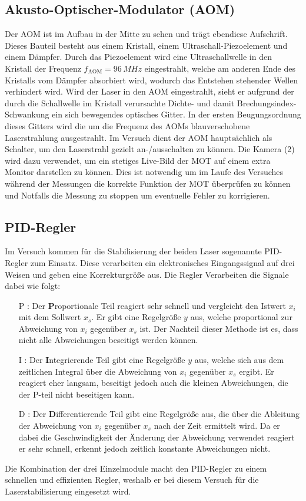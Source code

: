\documentclass[twoside,colorback,accentcolor=tud4c,11pt]{tudreport}
\begin{document}
\subsection{Akusto-Optischer-Modulator (AOM)}
Der AOM ist im Aufbau in der Mitte zu sehen und trägt ebendiese Aufschrift. Dieses Bauteil besteht aus einem Kristall, einem Ultraschall-Piezoelement und einem Dämpfer. Durch das Piezoelement wird eine Ultraschallwelle in den Kristall der Frequenz $f_{\text{AOM}}=96\,\si{MHz}$ eingestrahlt, welche am anderen Ende des Kristalls vom Dämpfer absorbiert wird, wodurch das Entstehen stehender Wellen verhindert wird. Wird der Laser in den AOM eingestrahlt, sieht er aufgrund der durch die Schallwelle im Kristall verursachte Dichte- und damit Brechungsindex-Schwankung ein sich bewegendes optisches Gitter. In der ersten Beugungsordnung dieses Gitters wird die um die Frequenz des AOMs blauverschobene Laserstrahlung ausgestrahlt. Im Versuch dient der AOM hauptsächlich als Schalter, um den Laserstrahl gezielt an-/ausschalten zu können.
Die Kamera (2) wird dazu verwendet, um ein stetiges Live-Bild der MOT auf einem extra Monitor darstellen zu können. Dies ist notwendig um im Laufe des Versuches während der Messungen die korrekte Funktion der MOT überprüfen zu können und Notfalls die Messung zu stoppen um eventuelle Fehler zu korrigieren.
\subsection{PID-Regler}
Im Versuch kommen für die Stabilisierung der beiden Laser sogenannte PID-Regler zum Einsatz. Diese verarbeiten ein elektronisches Eingangssignal auf drei Weisen und geben eine Korrekturgröße aus. Die Regler Verarbeiten die Signale dabei wie folgt:
\begin{itemize}
\item[P]: Der $\textbf{P}$roportionale Teil reagiert sehr schnell und vergleicht den Istwert $x_i$ mit dem Sollwert $x_s$. Er gibt eine Regelgröße $y$ aus, welche proportional zur Abweichung von $x_i$ gegenüber $x_s$ ist. Der Nachteil dieser Methode ist es, dass nicht alle Abweichungen beseitigt werden können.
\item[I]: Der $\textbf{I}$ntegrierende Teil gibt eine Regelgröße $y$ aus, welche sich aus dem zeitlichen Integral über die Abweichung von $x_i$ gegenüber $x_s$ ergibt. Er reagiert eher langsam, beseitigt jedoch auch die kleinen Abweichungen, die der P-teil nicht beseitigen kann.
\item[D]: Der $\textbf{D}$ifferentierende Teil gibt eine Regelgröße aus, die über die Ableitung der Abweichung von $x_i$ gegenüber $x_s$ nach der Zeit ermittelt wird. Da er dabei die Geschwindigkeit der Änderung der Abweichung verwendet reagiert er sehr schnell, erkennt jedoch zeitlich konstante Abweichungen nicht.
\end{itemize}
Die Kombination der drei Einzelmodule macht den PID-Regler zu einem schnellen und effizienten Regler, weshalb er bei diesem Versuch für die Laserstabilisierung eingesetzt wird.
\end{document}
